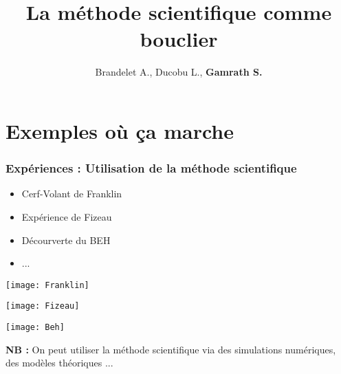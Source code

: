 \documentclass[11pt]{beamer}
\begin{document}
	\author{Brandelet A., Ducobu L., \textbf{Gamrath S.}}
	\title{La méthode scientifique comme bouclier}
	\date{}
	\begin{frame}[plain]
	\maketitle
\end{frame}
\section{Exemples où ça marche}
\begin{frame}
\frametitle{Expériences : Utilisation de la méthode scientifique}
\begin{itemize}
	\item Cerf-Volant de Franklin
	\item Expérience de Fizeau
	\item Décourverte du BEH
	\item ... 
\end{itemize}
\begin{minipage}[c]{0.31\linewidth}
	\begin{center}
		\texttt{[image: Franklin]} %
		\\
	\end{center}
\end{minipage}
\begin{minipage}[c]{0.33\linewidth}
	\begin{center}
		\texttt{[image: Fizeau]}\vspace{0.2cm}
	\end{center}
\end{minipage}
\begin{minipage}[c]{0.32\linewidth}
	\begin{center}
		\texttt{[image: Beh]} %
		\end{center}
\end{minipage}

\pause \textbf{NB :} On peut utiliser la méthode scientifique via des simulations numériques, des modèles théoriques ...
\end{frame}
\end{document}
